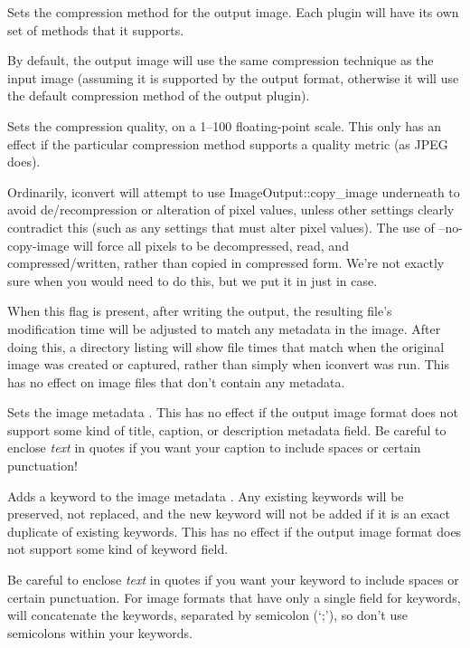 Sets the compression method for the output image.  Each \ImageOutput
plugin will have its own set of methods that it supports.

By default, the output image will use the same compression technique as
the input image (assuming it is supported by the output format,
otherwise it will use the default compression method of the output
plugin).  
\apiend

Sets the compression quality, on a 1--100 floating-point scale.
This only has an effect if the particular compression method supports
a quality metric (as JPEG does).
\apiend

Ordinarily, {\cf iconvert} will attempt to use {\cf
  ImageOutput::copy_image}
underneath to avoid de/recompression or alteration of pixel values,
unless other settings clearly contradict this (such as any settings
that must alter pixel values).  The use of {\cf --no-copy-image} will
force all pixels to be decompressed, read, and compressed/written,
rather than copied in compressed form.  We're not exactly sure when
you would need to do this, but we put it in just in case.
\apiend

When this flag is present, after writing the output, the resulting
file's modification time will be adjusted to match any 
metadata in the image.  After doing this, a directory listing will show
file times that match when the original image was created or captured,
rather than simply when {\cf iconvert} was run.  This has no effect on
image files that don't contain any  metadata.
\apiend

Sets the image metadata .
This has no effect if the output image format does not support some kind
of title, caption, or description metadata field.
Be careful to enclose \emph{text} in quotes if you want your caption to
include spaces or certain punctuation!
\apiend

Adds a keyword to the image metadata .  Any existing
keywords will be preserved, not replaced, and the new keyword will not
be added if it is an exact duplicate of existing keywords.  This has no
effect if the output image format does not support some kind of keyword
field.  

Be careful to enclose \emph{text} in quotes if you want your keyword to
include spaces or certain punctuation.  For image formats that have only
a single field for keywords, \OpenImageIO will concatenate the keywords,
separated by semicolon (`;'), so don't use semicolons within your
keywords.
\apiend

